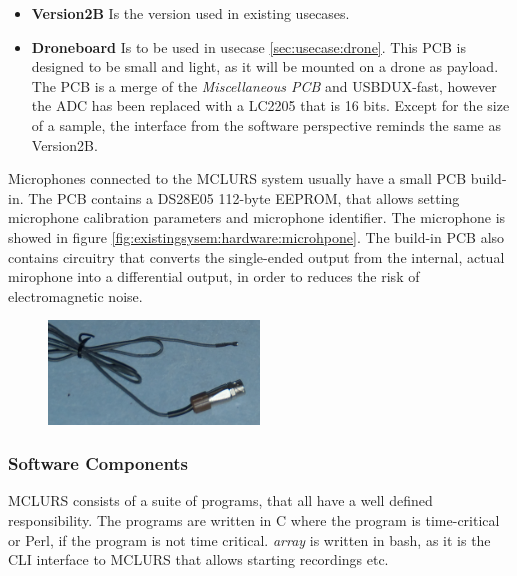 \begin{itemize}
	\item \textbf{Version2B} Is the version used in existing usecases. 

	\item \textbf{Droneboard} Is to be used in usecase \ref{sec:usecase:drone}. This PCB is designed to be small and light, as it will be mounted on a drone as payload. The PCB is a merge of the \textit{Miscellaneous PCB} and USBDUX-fast, however the ADC has been replaced with a LC2205 that is 16 bits. Except for the size of a sample, the interface from the software perspective reminds the same as Version2B.

\end{itemize}
Microphones connected to the MCLURS system usually have a small PCB build-in. The PCB contains a DS28E05 112-byte EEPROM, that allows setting microphone calibration parameters and microphone identifier. The microphone is showed in figure \ref{fig:existingsysem:hardware:microhpone}. The build-in PCB also contains circuitry that converts the single-ended output from the internal, actual mirophone into a differential output, in order to reduces the risk of electromagnetic noise.

\begin{figure}[h!]
	\centering
	\includegraphics[width=0.5\textwidth]{figures/mclurs_microphone}
\end{figure}
\subsubsection{Software Components} \label{sec:existingsystem:software}
MCLURS consists of a suite of programs, that all have a well defined responsibility. The programs are written in C where the program is time-critical or Perl, if the program is not time critical. \textit{array} is written in bash, as it is the CLI interface to MCLURS that allows starting recordings etc.

